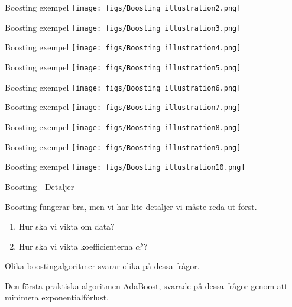 \documentclass[10pt,english]{beamer}
\begin{document}
\begin{frame}{Boosting exempel}
    \texttt{[image: figs/Boosting illustration2.png]}
\end{frame}

\begin{frame}{Boosting exempel}
    \texttt{[image: figs/Boosting illustration3.png]}
\end{frame}

\begin{frame}{Boosting exempel}
    \texttt{[image: figs/Boosting illustration4.png]}
\end{frame}

\begin{frame}{Boosting exempel}
    \texttt{[image: figs/Boosting illustration5.png]}
\end{frame}

\begin{frame}{Boosting exempel}
    \texttt{[image: figs/Boosting illustration6.png]}
\end{frame}

\begin{frame}{Boosting exempel}
    \texttt{[image: figs/Boosting illustration7.png]}
\end{frame}

\begin{frame}{Boosting exempel}
    \texttt{[image: figs/Boosting illustration8.png]}
\end{frame}

\begin{frame}{Boosting exempel}
    \texttt{[image: figs/Boosting illustration9.png]}
\end{frame}

\begin{frame}{Boosting exempel}
    \texttt{[image: figs/Boosting illustration10.png]}
\end{frame}

\begin{frame}{Boosting - Detaljer}
    
    Boosting fungerar bra, men vi har lite detaljer vi måste reda ut först.

    \begin{enumerate}
        \item Hur ska vi vikta om data?
        \item Hur ska vi vikta koefficienterna $\alpha^b$?
    \end{enumerate}

    Olika boostingalgoritmer svarar olika på dessa frågor.

    Den första praktiska algoritmen AdaBoost, svarade på dessa frågor genom att minimera exponentialförlust.

\end{frame}
\end{document}
